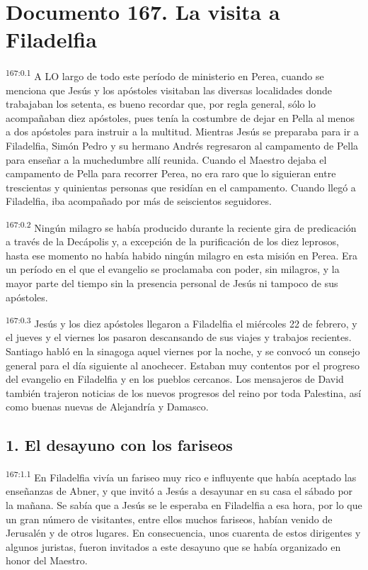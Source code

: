 \chapter{Documento 167. La visita a Filadelfia}
\par 
\textsuperscript{167:0.1} A LO largo de todo este período de ministerio en Perea, cuando se menciona que Jesús y los apóstoles visitaban las diversas localidades donde trabajaban los setenta, es bueno recordar que, por regla general, sólo lo acompañaban diez apóstoles, pues tenía la costumbre de dejar en Pella al menos a dos apóstoles para instruir a la multitud. Mientras Jesús se preparaba para ir a Filadelfia, Simón Pedro y su hermano Andrés regresaron al campamento de Pella para enseñar a la muchedumbre allí reunida. Cuando el Maestro dejaba el campamento de Pella para recorrer Perea, no era raro que lo siguieran entre trescientas y quinientas personas que residían en el campamento. Cuando llegó a Filadelfia, iba acompañado por más de seiscientos seguidores.

\par 
\textsuperscript{167:0.2} Ningún milagro se había producido durante la reciente gira de predicación a través de la Decápolis y, a excepción de la purificación de los diez leprosos, hasta ese momento no había habido ningún milagro en esta misión en Perea. Era un período en el que el evangelio se proclamaba con poder, sin milagros, y la mayor parte del tiempo sin la presencia personal de Jesús ni tampoco de sus apóstoles.

\par 
\textsuperscript{167:0.3} Jesús y los diez apóstoles llegaron a Filadelfia el miércoles 22 de febrero, y el jueves y el viernes los pasaron descansando de sus viajes y trabajos recientes. Santiago habló en la sinagoga aquel viernes por la noche, y se convocó un consejo general para el día siguiente al anochecer. Estaban muy contentos por el progreso del evangelio en Filadelfia y en los pueblos cercanos. Los mensajeros de David también trajeron noticias de los nuevos progresos del reino por toda Palestina, así como buenas nuevas de Alejandría y Damasco.

\section*{1. El desayuno con los fariseos}
\par 
\textsuperscript{167:1.1} En Filadelfia vivía un fariseo muy rico e influyente que había aceptado las enseñanzas de Abner, y que invitó a Jesús a desayunar en su casa el sábado por la mañana. Se sabía que a Jesús se le esperaba en Filadelfia a esa hora, por lo que un gran número de visitantes, entre ellos muchos fariseos, habían venido de Jerusalén y de otros lugares. En consecuencia, unos cuarenta de estos dirigentes y algunos juristas, fueron invitados a este desayuno que se había organizado en honor del Maestro.


